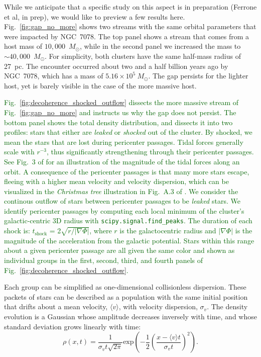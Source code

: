 \documentclass{aa}
\newcommand{\salvatore}[1]{\textcolor{darkgreen}{{#1}}}
\begin{document}
\begin{appendix}
  While we anticipate that a specific study on this aspect is in preparation (Ferrone et al, in prep), we would like to preview a few results here. Fig.~\ref{fig:gap_no_more} shows two streams with the same orbital parameters that were impacted by NGC~7078. The top panel shows a stream that comes from a host mass of $10,000$~$M_\odot$, while in the second panel we increased the mass to $\sim40,000$~$M_\odot$. For simplicity, both clusters have the same half-mass radius of 27~pc. The encounter occurred about two and a half billion years ago by NGC~7078, which has a mass of $5.16\times10^{5}~M_\odot$. The gap persists for the lighter host, yet is barely visible in the case of the more massive host. 

  \salvatore{Fig.~\ref{fig:decoherence_shocked_outflow} dissects the more massive stream of Fig.~\ref{fig:gap_no_more} and instructs us why the gap does not persist. The bottom panel shows the total density distribution, and dissects it into two profiles: stars that either are \textit{leaked} or \textit{shocked} out of the cluster. By shocked, we mean the stars that are lost during pericenter passages. Tidal forces generally scale with $r^{-3}$, thus significantly strengthening through their pericenter passages. See Fig.~3 of \citet{2004AJ....127.2753D} for an illustration of the magnitude of the tidal forces along an orbit. A consequence of the pericenter passages is that many more stars escape, fleeing with a higher mean velocity and velocity dispersion, which can be visualized in the \textit{Christmas tree} illustration in Fig.~A.3 of \citet{2012A&A...546L...7M}. We consider the continous outflow of stars between pericenter passages to be \textit{leaked} stars. We identify pericenter passages by computing each local minimum of the cluster's galactic-centric 3D radius with \texttt{scipy.signal.find\_peaks}. The duration of each shock is: $t_{\textrm{shock}}$ = 2$\sqrt{r/|\nabla\Phi|}$, where $r$ is the galactocentric radius and $|\nabla\Phi|$ is the magnitude of the acceleration from the galactic potential. Stars within this range about a given pericenter passage are all given the same color and shown as individual groups in the first, second, third, and fourth panels of Fig.~\ref{fig:decoherence_shocked_outflow}.}



  Each group can be simplified as one-dimensional collisionless dispersion. These packets of stars can be described as a population with the same initial position that drifts about a mean velocity, $\langle v \rangle$, with velocity dispersion, $\sigma_v$. The density evolution is a Gaussian whose amplitude decreases inversely with time, and whose standard deviation grows linearly with time:
  \begin{equation}    
          \rho(x,t) = \frac{1}{\sigma_v t \sqrt{2\pi} }\textrm{exp}\left(-\frac{1}{2}\left(\frac{x-\langle v \rangle t}{\sigma_v t}\right)^2\right).
  \end{equation}


\end{appendix}
\end{document}
